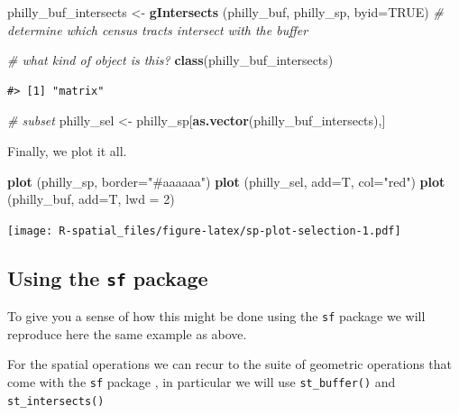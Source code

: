 \documentclass[]{book}
\newenvironment{Shaded}{\begin{snugshade}}{\end{snugshade}}
\newcommand{\KeywordTok}[1]{\textcolor[rgb]{0.13,0.29,0.53}{\textbf{#1}}}
\newcommand{\DataTypeTok}[1]{\textcolor[rgb]{0.13,0.29,0.53}{#1}}
\newcommand{\DecValTok}[1]{\textcolor[rgb]{0.00,0.00,0.81}{#1}}
\newcommand{\StringTok}[1]{\textcolor[rgb]{0.31,0.60,0.02}{#1}}
\newcommand{\CommentTok}[1]{\textcolor[rgb]{0.56,0.35,0.01}{\textit{#1}}}
\newcommand{\OtherTok}[1]{\textcolor[rgb]{0.56,0.35,0.01}{#1}}
\newcommand{\NormalTok}[1]{#1}
\theoremstyle{definition}
\theoremstyle{definition}
\theoremstyle{definition}
\theoremstyle{remark}
\begin{document}
\begin{Shaded}
\begin{Highlighting}[]
\NormalTok{philly_buf_intersects <-}\StringTok{  }\KeywordTok{gIntersects}\NormalTok{ (philly_buf, philly_sp, }\DataTypeTok{byid=}\OtherTok{TRUE}\NormalTok{) }\CommentTok{# determine which census tracts intersect with the buffer}

\CommentTok{# what kind of object is this?}
\KeywordTok{class}\NormalTok{(philly_buf_intersects)}
\end{Highlighting}
\end{Shaded}

\begin{verbatim}
#> [1] "matrix"
\end{verbatim}

\begin{Shaded}
\begin{Highlighting}[]
\CommentTok{# subset}
\NormalTok{philly_sel <-}\StringTok{ }\NormalTok{philly_sp[}\KeywordTok{as.vector}\NormalTok{(philly_buf_intersects),]}
\end{Highlighting}
\end{Shaded}

Finally, we plot it all.

\begin{Shaded}
\begin{Highlighting}[]
\KeywordTok{plot}\NormalTok{ (philly_sp, }\DataTypeTok{border=}\StringTok{"#aaaaaa"}\NormalTok{)}
\KeywordTok{plot}\NormalTok{ (philly_sel, }\DataTypeTok{add=}\NormalTok{T, }\DataTypeTok{col=}\StringTok{"red"}\NormalTok{) }
\KeywordTok{plot}\NormalTok{ (philly_buf, }\DataTypeTok{add=}\NormalTok{T, }\DataTypeTok{lwd =} \DecValTok{2}\NormalTok{)}
\end{Highlighting}
\end{Shaded}

\texttt{[image: R-spatial\_files/figure-latex/sp-plot-selection-1.pdf]}

\subsection{\texorpdfstring{Using the \texttt{sf}
package}{Using the sf package}}\label{using-the-sf-package}

To give you a sense of how this might be done using the \texttt{sf}
package we will reproduce here the same example as above.

For the spatial operations we can recur to the suite of geometric
operations that come with the \texttt{sf} package , in particular we
will use \texttt{st\_buffer()} and \texttt{st\_intersects()}
\end{document}
